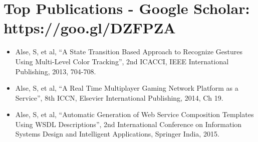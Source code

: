 \newcommand\textlcsc[1]{\textsc{\MakeTextLowercase{#1}}}
\section{Top Publications - \normalsize{Google Scholar: }\textup{https://goo.gl/DZFPZA}}
\begin{itemize}
\setlength\itemsep{-5pt}
\item Alse, S, et al, ``A State Transition Based Approach to Recognize Gestures Using Multi-Level Color Tracking'', 2nd ICACCI, IEEE International Publishing, 2013, 704-708.
\item Alse, S, et al, ``A Real Time Multiplayer Gaming Network Platform as a Service'', 8th ICCN, Elsevier International Publishing, 2014, Ch 19.
\item Alse, S, et al, ``Automatic Generation of Web Service Composition Templates Using WSDL Descriptions'', 2nd International Conference on Information Systems Design and Intelligent Applications, Springer India, 2015.
\end{itemize}
